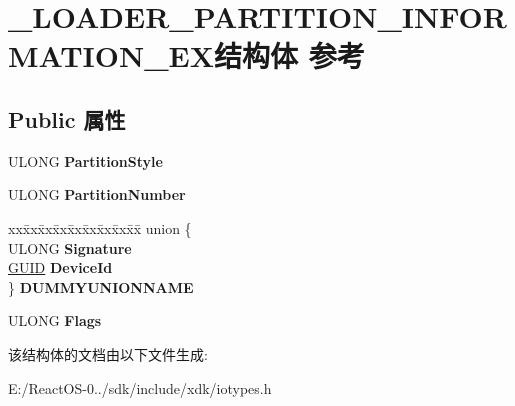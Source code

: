 \hypertarget{struct___l_o_a_d_e_r___p_a_r_t_i_t_i_o_n___i_n_f_o_r_m_a_t_i_o_n___e_x}{}\section{\+\_\+\+L\+O\+A\+D\+E\+R\+\_\+\+P\+A\+R\+T\+I\+T\+I\+O\+N\+\_\+\+I\+N\+F\+O\+R\+M\+A\+T\+I\+O\+N\+\_\+\+E\+X结构体 参考}
\label{struct___l_o_a_d_e_r___p_a_r_t_i_t_i_o_n___i_n_f_o_r_m_a_t_i_o_n___e_x}
\subsection*{Public 属性}
\begin{DoxyCompactItemize}
\item 
\mbox{\label{struct___l_o_a_d_e_r___p_a_r_t_i_t_i_o_n___i_n_f_o_r_m_a_t_i_o_n___e_x_a967e0e57caa3f8d6e23e6f8b14048fa2}} 
U\+L\+O\+NG {\bfseries Partition\+Style}
\item 
\mbox{\label{struct___l_o_a_d_e_r___p_a_r_t_i_t_i_o_n___i_n_f_o_r_m_a_t_i_o_n___e_x_ab860eefe4d30edacc256e83944c22f08}} 
U\+L\+O\+NG {\bfseries Partition\+Number}
\item 
\mbox{\label{struct___l_o_a_d_e_r___p_a_r_t_i_t_i_o_n___i_n_f_o_r_m_a_t_i_o_n___e_x_a4d63ab7f2b4f8e89266dfbd6d1f1fd5a}} 
\begin{tabbing}
xx\=xx\=xx\=xx\=xx\=xx\=xx\=xx\=xx\=\kill
union \{\\
\>ULONG {\bfseries Signature}\\
\>\hyperlink{interface_g_u_i_d}{GUID} {\bfseries DeviceId}\\
\} {\bfseries DUMMYUNIONNAME}\\

\end{tabbing}\item 
\mbox{\label{struct___l_o_a_d_e_r___p_a_r_t_i_t_i_o_n___i_n_f_o_r_m_a_t_i_o_n___e_x_ada08f1406e18ed32b4e523d0e49d1a6b}} 
U\+L\+O\+NG {\bfseries Flags}
\end{DoxyCompactItemize}


该结构体的文档由以下文件生成\+:\begin{DoxyCompactItemize}
\item 
E\+:/\+React\+O\+S-\/0../sdk/include/xdk/iotypes.\+h\end{DoxyCompactItemize}
